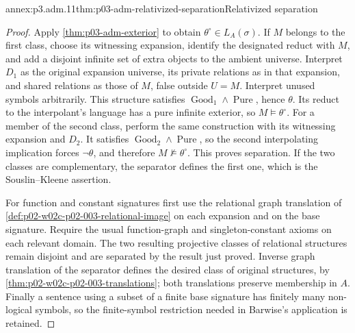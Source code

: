 \begin{annexitem}{annex:p3.adm.11}{thm:p03-adm-relativized-separation}{Relativized separation}
\begin{proof}
Apply \cref{thm:p03-adm-exterior} to obtain \(\theta^\circ\in L_A(\sigma)\).
If \(M\) belongs to the first class, choose its witnessing expansion,
identify the designated reduct with \(M\), and add a disjoint infinite
set of extra objects to the ambient universe. Interpret \(D_1\) as
the original expansion universe, its private relations as in that
expansion, and shared relations as those of \(M\), false outside
\(U=M\). Interpret unused symbols arbitrarily. This structure satisfies
\(\operatorname{Good}_1\land\operatorname{Pure}\), hence \(\theta\).
Its reduct to the interpolant's language has a pure infinite exterior,
so \(M\models\theta^\circ\). For a member of the second class, perform
the same construction with its witnessing expansion and \(D_2\).
It satisfies \(\operatorname{Good}_2\land\operatorname{Pure}\), so the
second interpolating implication forces \(\neg\theta\), and therefore
\(M\not\models\theta^\circ\). This proves separation. If the two classes
are complementary, the separator defines the first one, which is the
Souslin--Kleene assertion.

For function and constant signatures first use the relational graph
translation of \cref{def:p02-w02c-p02-003-relational-image} on each
expansion and on the base signature. Require the usual function-graph
and singleton-constant axioms on each relevant domain. The two resulting
projective classes of relational structures remain disjoint and are
separated by the result just proved. Inverse graph translation of the
separator defines the desired class of original structures, by
\cref{thm:p02-w02c-p02-003-translations}; both translations preserve
membership in \(A\). Finally a sentence using a subset of a finite
base signature has finitely many non-logical symbols, so the finite-symbol
restriction needed in Barwise's application is retained.
\end{proof}
\end{annexitem}
